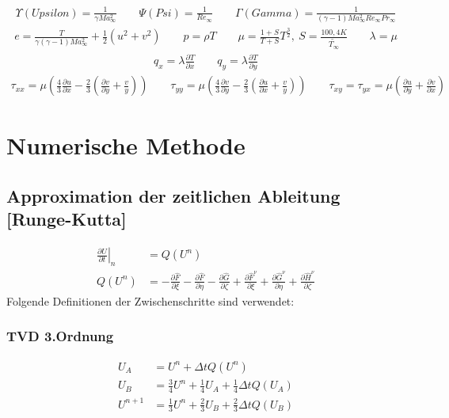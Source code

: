 \begin{align*}
\Upsilon (Upsilon)=\frac{1}{\gamma Ma_\infty^2}
\ \ \ \ \ \ \ \ \ 
\Psi (Psi)=\frac{1}{Re_\infty}
\ \ \ \ \ \ \ \ \ 
\Gamma (Gamma)=\frac{1}{\left(\gamma -1 \right)Ma_\infty^2 Re_\infty Pr_\infty}
\end{align*}
\begin{align*}
e=\frac{T}{\gamma \left(\gamma -1\right)Ma_\infty^2}+\frac{1}{2}\left(u^2+v^2\right)
\ \ \ \ \ \ \ \ \ 
p=\rho T
\ \ \ \ \ \ \ \ \ 
\mu=\frac{1+S}{T+S}T^\frac{3}{2},\ S=\frac{100,4K}{\tilde{T_\infty}}
\ \ \ \ \ \ \ \ \ 
\lambda=\mu
\end{align*}
\begin{align*}
q_x=\lambda \frac{\partial T}{\partial x}
\ \ \ \ \ \ \ \ \ 
q_y=\lambda \frac{\partial T}{\partial y}
\end{align*}
\begin{align*}
\tau_{xx}=\mu \left(\frac{4}{3}\frac{\partial u}{\partial x}-\frac{2}{3}\left(\frac{\partial v}{\partial y} +\frac{v}{y}\right)\right)
\ \ \ \ \ \ \ \ \
\tau_{yy}=\mu \left(\frac{4}{3}\frac{\partial v}{\partial y}-\frac{2}{3}\left(\frac{\partial u}{\partial x} +\frac{v}{y}\right)\right)
\ \ \ \ \ \ \ \ \ 
\tau_{xy}=\tau_{yx}=\mu \left(\frac{\partial u}{\partial y}+\frac{\partial v}{\partial x} \right)
\end{align*}


\section{Numerische Methode}
\subsection{Approximation der zeitlichen Ableitung [Runge-Kutta]}
\begin{align*}
\left. \frac{\partial U}{\partial t} \right|_n &=Q\left(U^{n}\right)
\\
Q\left(U^{n}\right)&=
-\frac{\partial \hat{F}}{\partial \xi}-\frac{\partial \hat{F}}{\partial \eta}-\frac{\partial \hat{G}}{\partial \zeta}
+
\frac{\partial \hat{F}^\nu}{\partial \xi}+\frac{\partial \hat{G}^\nu}{\partial \eta}+\frac{\partial \hat{H}^\nu}{\partial \zeta}
\end{align*}
Folgende Definitionen der Zwischenschritte sind verwendet:
\subsubsection{TVD 3.Ordnung}
\begin{align*}
U_{A}&=U^{n}+\varDelta t Q\left(U^{n}\right)
\\
U_{B}&=\frac{3}{4}U^{n}+\frac{1}{4}U_A+\frac{1}{4}\varDelta t Q\left(U_{A}\right)
\\
U^{n+1}&=\frac{1}{3}U^{n}+\frac{2}{3}U_B+\frac{2}{3}\varDelta t Q\left(U_{B}\right)
\end{align*}


